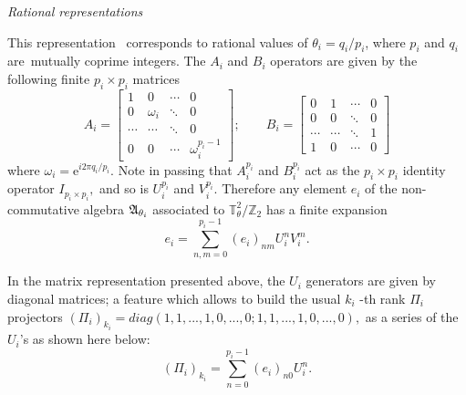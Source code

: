 \documentclass[a4paper,12pt]{article}
\begin{document}
\textit{Rational representations }

\quad This representation \ corresponds to rational values of $\theta
_{i}=q_{i}/p_{i}$, where $p_{i}$ and $q_{i}$ are\ mutually coprime integers.
The $A_{i}$ and $B_{i}$ operators are given by the following finite $%
p_{i}\times p_{i}$ matrices
\begin{equation}
A_{i}=\left[
\begin{array}{cccc}
1 & 0 & \cdots & 0 \\
0 & \omega _{i} & \ddots & 0 \\
\cdots & \cdots & \ddots & 0 \\
0 & 0 & \cdots & \omega _{i}^{p_{i}-1}
\end{array}
\right] ;\quad \quad B_{i}=\left[
\begin{array}{cccc}
0 & 1 & \cdots & 0 \\
0 & 0 & \ddots & 0 \\
\cdots & \cdots & \ddots & 1 \\
1 & 0 & \cdots & 0
\end{array}
\right]  \label{matrices}
\end{equation}
where $\omega _{i}=$e$^{i2\pi q_{i}/p_{i}}$. Note in passing that $%
A_{i}^{p_{i}}$ and $B_{i}^{p_{i}}$ act as the $p_{i}\times p_{i}$ identity
operator $I_{p_{i}\times p_{i}},$ and so is $U_{i}^{p_{i}}$ and $%
V_{i}^{p_{i}}$. Therefore any element $e_{i}$ of the non-commutative algebra
$\frak{A}_{\theta _{i}}$ associated to $\mathbb{T}_{\theta }^{2}/\mathbb{Z}%
_{2}$ has a finite expansion
\begin{equation}
e_{i}=\sum_{n,m=0}^{p_{i}-1}(e_{i})_{nm}U_{i}^{n}V_{i}^{m}.
\end{equation}

In the matrix representation presented above, the $U_{i}$ generators are
given by diagonal matrices; a feature which allows to build the usual $k_{i}$%
-th rank $\Pi _{i}$ projectors $(\Pi
_{i})_{k_{i}}=diag(1,1,...,1,0,...,0;1,1,...,1,0,...,0),$ as a
series of the $U_{i}$'s as shown here below:
\begin{equation}\label{ratpro}
(\Pi _{i})_{k_i}=\sum_{n=0}^{p_{i}-1}(e_{i})_{n0}U_{i}^{n}.
\end{equation}
\end{document}
